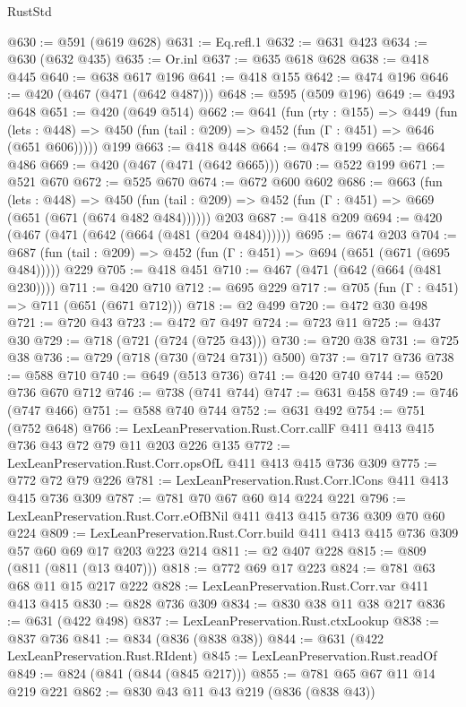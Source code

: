 \begin{lexlean}{RustStd}
\begin{coremodule}
@630 := @591 (@619 @628)
@631 := Eq.refl.{1}
@632 := @631 @423
@634 := @630 (@632 @435)
@635 := Or.inl
@637 := @635 @618 @628
@638 := @418 @445
@640 := @638 @617 @196
@641 := @418 @155
@642 := @474 @196
@646 := @420 (@467 (@471 (@642 @487)))
@648 := @595 (@509 @196)
@649 := @493 @648
@651 := @420 (@649 @514)
@662 := @641
    (fun (rty : @155) =>
    @449
      (fun (lets : @448) => @450 (fun (tail : @209) => @452 (fun (Γ : @451) => @646 (@651 @606)))))
    @199
@663 := @418 @448
@664 := @478 @199
@665 := @664 @486
@669 := @420 (@467 (@471 (@642 @665)))
@670 := @522 @199
@671 := @521 @670
@672 := @525 @670
@674 := @672 @600 @602
@686 := @663
    (fun (lets : @448) =>
    @450 (fun (tail : @209) => @452 (fun (Γ : @451) => @669 (@651 (@671 (@674 @482 @484))))))
    @203
@687 := @418 @209
@694 := @420 (@467 (@471 (@642 (@664 (@481 (@204 @484))))))
@695 := @674 @203
@704 := @687 (fun (tail : @209) => @452 (fun (Γ : @451) => @694 (@651 (@671 (@695 @484))))) @229
@705 := @418 @451
@710 := @467 (@471 (@642 (@664 (@481 @230))))
@711 := @420 @710
@712 := @695 @229
@717 := @705 (fun (Γ : @451) => @711 (@651 (@671 @712)))
@718 := @2 @499
@720 := @472 @30 @498
@721 := @720 @43
@723 := @472 @7 @497
@724 := @723 @11
@725 := @437 @30
@729 := @718 (@721 (@724 (@725 @43)))
@730 := @720 @38
@731 := @725 @38
@736 := @729 (@718 (@730 (@724 @731)) @500)
@737 := @717 @736
@738 := @588 @710
@740 := @649 (@513 @736)
@741 := @420 @740
@744 := @520 @736 @670 @712
@746 := @738 (@741 @744)
@747 := @631 @458
@749 := @746 (@747 @466)
@751 := @588 @740 @744
@752 := @631 @492
@754 := @751 (@752 @648)
@766 := LexLeanPreservation.Rust.Corr.callF @411 @413 @415 @736 @43 @72 @79 @11 @203 @226 @135
@772 := LexLeanPreservation.Rust.Corr.opsOfL @411 @413 @415 @736 @309
@775 := @772 @72 @79 @226
@781 := LexLeanPreservation.Rust.Corr.lCons @411 @413 @415 @736 @309
@787 := @781 @70 @67 @60 @14 @224 @221
@796 := LexLeanPreservation.Rust.Corr.eOfBNil @411 @413 @415 @736 @309 @70 @60 @224
@809 := LexLeanPreservation.Rust.Corr.build @411 @413 @415 @736 @309 @57 @60 @69 @17 @203 @223 @214
@811 := @2 @407 @228
@815 := @809 (@811 (@811 (@13 @407)))
@818 := @772 @69 @17 @223
@824 := @781 @63 @68 @11 @15 @217 @222
@828 := LexLeanPreservation.Rust.Corr.var @411 @413 @415
@830 := @828 @736 @309
@834 := @830 @38 @11 @38 @217
@836 := @631 (@422 @498)
@837 := LexLeanPreservation.Rust.ctxLookup
@838 := @837 @736
@841 := @834 (@836 (@838 @38))
@844 := @631 (@422 LexLeanPreservation.Rust.RIdent)
@845 := LexLeanPreservation.Rust.readOf
@849 := @824 (@841 (@844 (@845 @217)))
@855 := @781 @65 @67 @11 @14 @219 @221
@862 := @830 @43 @11 @43 @219 (@836 (@838 @43))

\end{coremodule}
\end{lexlean}
